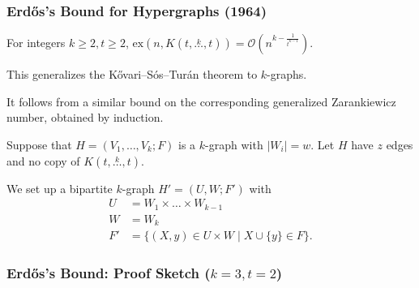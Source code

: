 \documentclass{beamer}
\newcommand{\ex}[2]{\ensuremath{\text{ex} \left( #1, #2 \right)}}
\newcommand{\compoverset}[2]{\ensuremath{K\left(#2, \overset{#1}{\dots}, #2\right)}} %
\newcommand{\bigO}[1]{\ensuremath{\mathcal{O}\left(#1\right)}}
\theoremstyle{mystyle}
\begin{document}
\begin{frame}
    \frametitle{Erd\H{o}s's Bound for Hypergraphs (1964)}

    \begin{theorem}[Erd\H{o}s '64]
        For integers $k \ge 2, t \ge 2$,
        $\ex{n}{\compoverset{k}{t}} = \bigO{n^{k - \frac{1}{t^{k-1}}}}.$
    \end{theorem}

    This generalizes the Kővari--Sós--Turán theorem to $k$-graphs.

    It follows from a similar bound on the corresponding generalized Zarankiewicz number,
    obtained by induction.

    Suppose that $H = (V_1, \dots, V_k; F)$ is a $k$-graph with $|W_i| = w$.
    Let $H$ have $z$ edges and no copy of $\compoverset{k}{t}$.

    We set up a bipartite $k$-graph $H' = (U, W; F')$ with
    \begin{align*}
        U &=  W_1 \times \dots \times W_{k-1} \\
        W &= W_k \\
        F' &= \{(X, y) \in U \times W \mid X \cup \{y\} \in F\}.
    \end{align*}

\end{frame}

\begin{frame}[fragile]
    \frametitle{Erd\H{o}s's Bound: Proof Sketch ($k=3, t=2$)}

    \begin{adjustwidth}{-0.5cm}{0cm} %

        \begin{figure}
            \centering
            \scalebox{0.6}{
                
            }
        \end{figure}

    \end{adjustwidth}

\end{frame}
\end{document}
